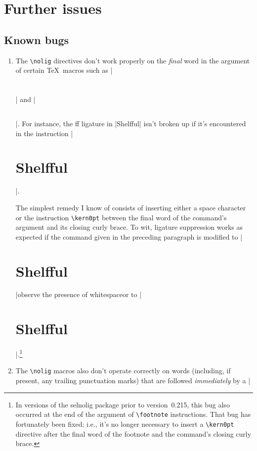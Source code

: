 \documentclass[11pt]{article}
\newcommand{\pkg}[1]{\textsf{#1}}
\newcommand{\cmmd}[1]{\texttt{\textbackslash #1}}
\begin{document}
\section{Further issues}

\subsection{Known bugs}

\begin{enumerate}
\item The \cmmd{nolig} directives don't work properly on the \emph{final} word in the argument of certain \TeX\ macros such as |\section{}| and |\subsection{}|. For instance, the ff ligature in |Shelfful| isn't broken up if it's encountered in the instruction |\section{Shelfful}|.

The simplest remedy I know of consists of inserting either a space character or the instruction \cmmd{kern0pt} between the final word of the command's argument and its closing curly brace. To wit, ligature suppression works as expected if the command given in the preceding paragraph is modified to |\section{Shelfful }|\textemdash observe the presence of whitespace\textemdash or to |\section{Shelfful\kern0pt}|.\footnote{In versions of the \pkg{selnolig} package prior to version~0.215, this bug also occurred at the end of the argument of \cmmd{footnote} instructions. That bug has fortunately been fixed; i.e., it's no longer necessary to insert a \cmmd{kern0pt} directive after the final word of the footnote and the command's closing curly brace.}

\item The \cmmd{nolig} macros also don't operate correctly on words (including, if present, any trailing punctuation marks) that are followed \emph{immediately} by a |%


\end{enumerate}
\end{document}
